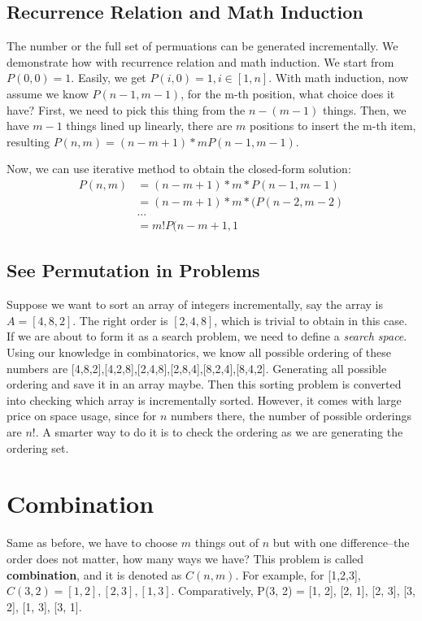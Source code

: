 \documentclass[../main.tex]{subfiles}
\begin{document}
\subsection{Recurrence Relation and Math Induction} The number or the full set of permuations can be generated incrementally. We demonstrate how with recurrence relation and math induction. We start from $P(0,0)=1$. Easily, we get $P(i, 0)=1, i\in[1, n]$. With math induction, now assume we know $P(n-1, m-1)$, for the m-th position, what choice does it have? First, we need to pick this thing from the $n-(m-1)$ things. Then,  we have $m-1$ things lined up linearly, there are $m$ positions to insert the m-th item, resulting $P(n, m) = (n-m+1)*mP(n-1, m-1)$.

Now, we can use iterative method to obtain the closed-form solution:
\begin{align}
    P(n, m) &= (n-m+1)*m*P(n-1, m-1)\\
    &=(n-m+1)*m*(P(n-2, m-2) \\
    &...\\
    &=m!P(n-m+1, 1
\end{align}

\subsection{See Permutation in Problems} Suppose we want to sort an array of integers incrementally, say the array is $A=[4,8,2]$. The right order is $[2,4,8]$, which is trivial to obtain in this case. If we are about to form it as a search problem, we need to define a \textit{search space}. Using our knowledge in combinatorics, we know all possible ordering of these numbers are [4,8,2],[4,2,8],[2,4,8],[2,8,4],[8,2,4],[8,4,2]. Generating all possible ordering and save it in an array maybe. Then this sorting problem is converted into checking which array is incrementally sorted. However, it comes with large price on space usage, since for $n$ numbers there, the number of possible orderings are $n!$. A smarter way to do it is to check the ordering as we are generating the ordering set.

\section{Combination}
Same as before, we have to choose $m$ things out of $n$ but with one difference--the order does not matter, how many ways we have?  This problem is called \textbf{combination}, and it is denoted as $C(n,m)$. For example, for [1,2,3], $C(3, 2)=[1, 2], [2, 3], [1, 3]$. Comparatively, P(3, 2) = [1, 2], [2, 1], [2, 3], [3, 2], [1, 3], [3, 1]. 
\end{document}
